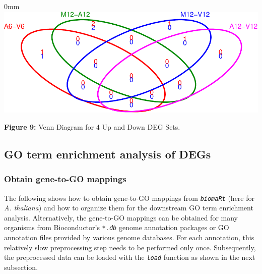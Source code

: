 \documentclass[14pt,]{article}
\begin{document}
\begin{adjustwidth}{\fltoffset}{0mm}
\includegraphics[width=1\linewidth,]{systemPipeR_files/figure-latex/vennplot-1} \end{adjustwidth}

\textbf{Figure 9:} Venn Diagram for 4 Up and Down DEG Sets.

\hypertarget{go-term-enrichment-analysis-of-degs}{%
\subsection{GO term enrichment analysis of DEGs}\label{go-term-enrichment-analysis-of-degs}}

\hypertarget{obtain-gene-to-go-mappings}{%
\subsubsection{Obtain gene-to-GO mappings}\label{obtain-gene-to-go-mappings}}

The following shows how to obtain gene-to-GO mappings from \emph{\texttt{biomaRt}} (here for \emph{A. thaliana}) and how to organize them for the downstream GO term enrichment analysis. Alternatively, the gene-to-GO mappings can be obtained for many organisms from Bioconductor's \emph{\texttt{*.db}} genome annotation packages or GO annotation files provided by various genome databases. For each annotation, this relatively slow preprocessing step needs to be performed only once. Subsequently, the preprocessed data can be loaded with the \emph{\texttt{load}} function as shown in the next subsection.
\end{document}
